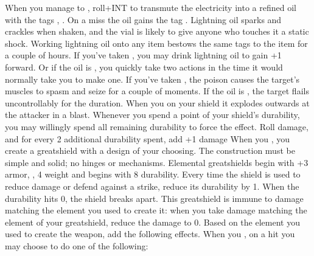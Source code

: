 \documentclass[darkmode]{dw_playbook}
\begin{document}
\pageThree
    {
        \advancedMovesCont
    }
    {
            {When you manage to , roll+INT to transmute the electricity into a refined oil with the tags , .  On a miss the oil gains the tag .  Lightning oil sparks and crackles when shaken, and the vial is likely to give anyone who touches it a static shock.  Working lightning oil onto any item bestows the same tags to the item for a couple of hours.
            \gap
            If you’ve taken , you may drink lightning oil to gain +1 forward.  Or if the oil is , you quickly take two actions in the time it would normally take you to make one.
            \gap
            If you’ve taken , the poison causes the target’s muscles to spasm and seize for a couple of moments.  If the oil is , the target flails uncontrollably for the duration.}
        \gap
            {When you  on your shield it explodes outwards at the attacker in a  blast.
            \gap
            Whenever you spend a point of your shield’s durability, you may willingly spend all remaining durability to force the effect.  Roll damage, and for every 2 additional durability spent, add +1 damage}
            {When you , you create a greatshield with a design of your choosing.  The construction must be simple and solid; no hinges or mechanisms.  Elemental greatshields begin with +3 armor, , 4 weight and begins with 8 durability.
            \gap
            Every time the shield is used to reduce damage or defend against a strike, reduce its durability by 1.  When the durability hits 0, the shield breaks apart.  This greatshield is immune to damage matching the element you used to create it: when you take damage matching the element of your greatshield, reduce the damage to 0.
            \gap
            Based on the element you used to create the weapon, add the following effects.
            \gapSm
            \gapSm
            \gapSm
            \gapSm
            }
        \gap
            {
            When you , on a hit you may choose to do one of the following:
            \gapSm
            \gapSm
            }
    }
    {
        ~
    }
\end{document}
